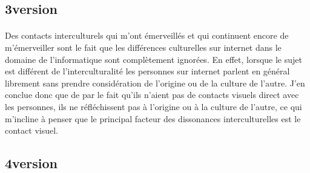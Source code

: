  

\subsection{3\ieme version}
\paragraph{}
Des contacts interculturels qui m'ont émerveillés et qui continuent encore de m'émerveiller sont le fait que les différences culturelles sur internet dans le domaine de l'informatique sont complètement ignorées. En effet, lorsque le sujet est différent de l'interculturalité les personnes sur internet parlent en général librement sans prendre considération de l'origine ou de la culture de l'autre. J'en conclue donc que de par le fait qu'ils n'aient pas de contacts visuels direct avec les personnes, ils ne réfléchissent pas à l'origine ou à la culture de l'autre, ce qui m'incline à penser que le principal facteur des dissonances interculturelles est le contact visuel.

\subsection{4\ieme version}
